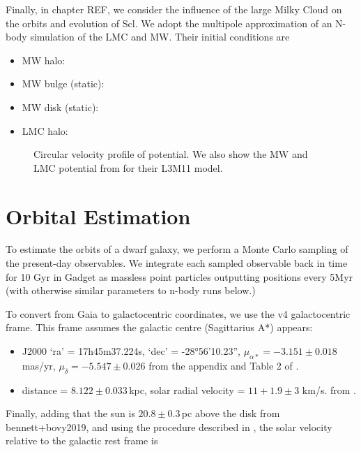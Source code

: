 Finally, in chapter REF, we consider the influence of the large Milky
Cloud on the orbits and evolution of Scl. We adopt the
\citet{vasiliev2024} multipole approximation of an N-body simulation of
the LMC and MW. Their initial conditions are

\begin{itemize}
\tightlist
\item
  MW halo:
\item
  MW bulge (static):
\item
  MW disk (static):
\item
  LMC halo:
\end{itemize}

\begin{figure}
\centering
{}
\caption[Circular velocity of potential]{Circular velocity profile of
\citet{EP2020} potential. We also show the MW and LMC potential from
\citet{vasiliev2024} for their L3M11 model.}\label{fig:v_circ_potential}
\end{figure}

\section{Orbital Estimation}\label{orbital-estimation}

To estimate the orbits of a dwarf galaxy, we perform a Monte Carlo
sampling of the present-day observables. We integrate each sampled
observable back in time for 10 Gyr in Gadget as massless point particles
outputting positions every 5Myr (with otherwise similar parameters to
n-body runs below.)

To convert from Gaia to galactocentric coordinates, we use the
\citet{astropy} v4 galactocentric frame. This frame assumes the galactic
centre (Sagittarius A*) appears:

\begin{itemize}
\tightlist
\item
  J2000 `ra' = 17h45m37.224s, `dec' = -28°56'10.23'',
  \(\mu_{\alpha*}=-3.151\pm0.018\) mas/yr, \(\mu_\delta=-5.547\pm0.026\)
  from the appendix and Table 2 of \citet{reid+brunthaler2004}.
\item
  distance = \(8.122\pm0.033\,\)kpc, solar radial velocity =
  \(11 + 1.9 \pm 3\) km/s. from \citet{gravitycollaboration+2018}.
\end{itemize}

Finally, adding that the sun is \(20.8\pm0.3\,\)pc above the disk from
bennett+bovy2019, and using the procedure described in
\citet{drimmel+poggio2018}, the solar velocity relative to the galactic
rest frame is

